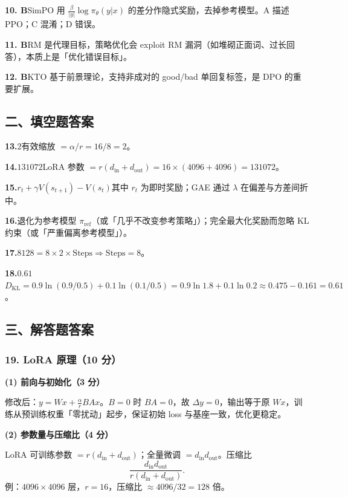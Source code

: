 \documentclass[11pt,a4paper]{article}
\begin{document}
\noindent\textbf{10. B}\quad SimPO 用 $\frac{\beta}{|y|}\log\pi_\theta(y|x)$ 的差分作隐式奖励，去掉参考模型。A 描述 PPO；C 混淆；D 错误。

\noindent\textbf{11. B}\quad RM 是代理目标，策略优化会 exploit RM 漏洞（如堆砌正面词、过长回答），本质上是「优化错误目标」。

\noindent\textbf{12. B}\quad KTO 基于前景理论，支持非成对的 good/bad 单回复标签，是 DPO 的重要扩展。

\subsection*{\heiti 二、填空题答案}

\noindent\textbf{13.}\quad $2$\quad 有效缩放 $=\alpha/r=16/8=2$。

\noindent\textbf{14.}\quad $131072$\quad LoRA 参数 $=r(d_{\mathrm{in}}+d_{\mathrm{out}})=16\times(4096+4096)=131072$。

\noindent\textbf{15.}\quad $r_t+\gamma V(s_{t+1})-V(s_t)$\quad 其中 $r_t$ 为即时奖励；GAE 通过 $\lambda$ 在偏差与方差间折中。

\noindent\textbf{16.}\quad 退化为参考模型 $\pi_{\mathrm{ref}}$（或「几乎不改变参考策略」）\quad ；\quad 完全最大化奖励而忽略 KL 约束（或「严重偏离参考模型」）。

\noindent\textbf{17.}\quad $8$\quad $128=8\times2\times\text{Steps}\Rightarrow\text{Steps}=8$。

\noindent\textbf{18.}\quad $0.61$\quad $D_{\mathrm{KL}}=0.9\ln(0.9/0.5)+0.1\ln(0.1/0.5)=0.9\ln 1.8+0.1\ln 0.2\approx0.475-0.161=0.61$。

\subsection*{\heiti 三、解答题答案}

\subsubsection*{19. LoRA 原理（10 分）}

\noindent\textbf{(1) 前向与初始化（3 分）}

修改后：$y = Wx + \frac{\alpha}{r}BAx$。$B=0$ 时 $BA=0$，故 $\Delta y=0$，输出等于原 $Wx$，训练从预训练权重「零扰动」起步，保证初始 loss 与基座一致，优化更稳定。

\noindent\textbf{(2) 参数量与压缩比（4 分）}

LoRA 可训练参数 $=r(d_{\mathrm{in}}+d_{\mathrm{out}})$；全量微调 $=d_{\mathrm{in}}d_{\mathrm{out}}$。压缩比
\[
\frac{d_{\mathrm{in}}d_{\mathrm{out}}}{r(d_{\mathrm{in}}+d_{\mathrm{out}})}.
\]
例：$4096\times4096$ 层，$r=16$，压缩比 $\approx 4096/32=128$ 倍。
\end{document}
